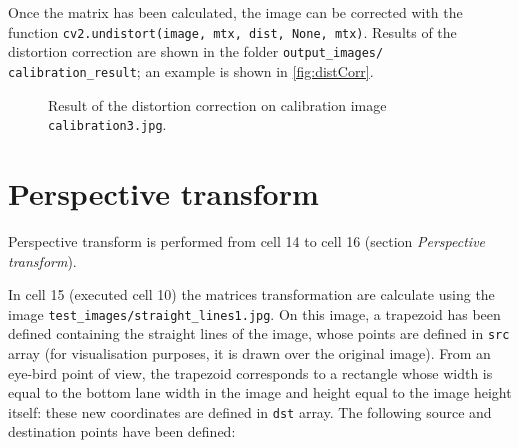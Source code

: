 \documentclass{article}
\let\cd\lstinline
\begin{document}
Once the matrix has been calculated, the image can be corrected with the function \cd+cv2.undistort(image, mtx, dist, None, mtx)+. Results of the distortion correction are shown in the folder \cd+output_images/+ \cd+calibration_result+; an example is shown in \autoref{fig:distCorr}.

\begin{figure}
\hfill
{}
\caption{Result of the distortion correction on calibration image \cd+calibration3.jpg+.}
\label{fig:distCorr}
\end{figure}

\section{Perspective transform}
\label{sec:perspTr}
Perspective transform is performed from cell 14 to cell 16 (section \textit{Perspective transform}).

In cell 15 (executed cell 10) the matrices transformation are calculate using the image \cd+test_images/straight_lines1.jpg+. On this image, a trapezoid has been defined containing the straight lines of the image, whose points are defined in \cd+src+ array (for visualisation purposes, it is drawn over the original image). From an eye-bird point of view, the trapezoid corresponds to a rectangle whose width is equal to the bottom lane width in the image and height equal to the image height itself: these new coordinates are defined in \cd+dst+ array. The following source and destination points have been defined:
\end{document}
